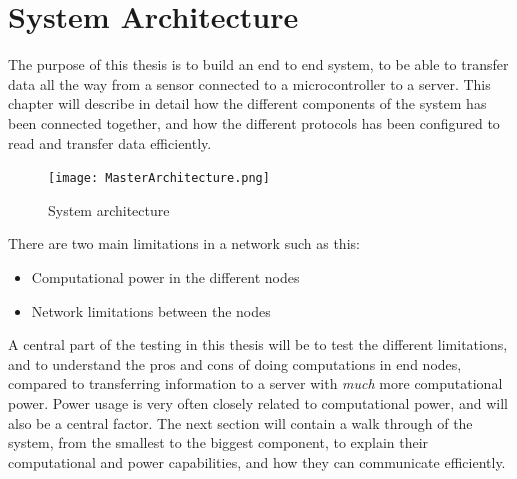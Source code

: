 \chapter{System Architecture}
\label{chp:architecture} 

The purpose of this thesis is to build an end to end system, to be able to transfer data all the way from a sensor connected to a microcontroller to a server. This chapter will describe in detail how the different components of the system has been connected together, and how the different protocols has been configured to read and transfer data efficiently. 


\begin{figure}[ht]
    \centering
    \texttt{[image: MasterArchitecture.png]}    \caption{System architecture}
    \label{fig:systemArchitecture}
\end{figure}

\newpage

There are two main limitations in a network such as this:

\begin{itemize}
  \item Computational power in the different nodes 
  \item Network limitations between the nodes
\end{itemize}

A central part of the testing in this thesis will be to test the different limitations, and to understand the pros and cons of doing computations in end nodes, compared to transferring information to a server with \textit{much} more computational power. Power usage is very often closely related to computational power, and will also be a central factor. The next section will contain a walk through of the system, from the smallest to the biggest component, to explain their computational and power capabilities, and how they can communicate efficiently. 




